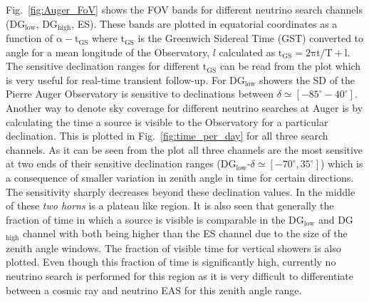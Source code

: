 Fig.~\ref{fig:Auger_FoV} shows the FOV bands for different neutrino search channels (DG$\mathrm{_{\text{low}}}$, DG$\mathrm{_{\text{high}}}$, ES). These bands are plotted in equatorial coordinates as a function of $\mathrm{\alpha - t _{GS}}$ where $\mathrm{t_{GS}}$ is the Greenwich Sidereal Time (GST) converted to angle for a mean longitude of the Observatory, $l$ calculated as $\mathrm{t_{GS}= 2\pi t/T + l}$. The sensitive declination ranges for different $\mathrm{t_{GS}}$ can be read from the plot which is very useful for real-time transient follow-up. For DG$\mathrm{_{\text{low}}}$ showers the SD of the Pierre Auger Observatory is sensitive to declinations between $\delta \simeq [-85^{\circ} - 40^{\circ}]$. Another way to denote sky coverage for different neutrino searches at Auger is by calculating the time a source is visible to the Observatory for a particular declination. This is plotted in Fig.~\ref{fig:time_per_day} for all three search channels. As it can be seen from the plot all three channels are the most sensitive at two ends of their sensitive declination ranges (DG$\mathrm{_{\text{low}}}$-$\delta \simeq [-70^{\circ}, 35^{\circ}]$) which is a consequence of smaller variation in zenith angle in time for certain directions. The sensitivity sharply decreases beyond these declination values. In the middle of these \textit{two horns} is a plateau like region. It is also seen that generally the fraction of time in which a source is visible is comparable in the DG$\mathrm{_{\text{low}}}$ and DG$\mathrm{_{\text{high}}}$ channel with both being higher than the ES channel due to the size of the zenith angle windows. The fraction of visible time for vertical showers is also plotted. Even though this fraction of time is significantly high, currently no neutrino search is performed for this region as it is very difficult to differentiate between a cosmic ray and neutrino EAS for this zenith angle range.


